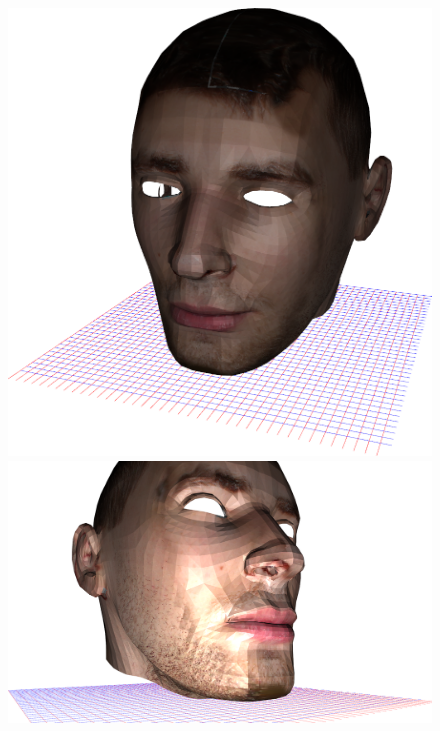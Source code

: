 \documentclass{article}
\begin{document}
\vfill
\begin{figure}[H]
    \centering
    \begin{minipage}{.5\textwidth}
        \centering
        \includegraphics[width=\linewidth]{pic_1.png}
    \end{minipage}%
    \begin{minipage}{.5\textwidth}
        \centering
        \includegraphics[width=\linewidth]{pic_2.png}
    \end{minipage}
    \begin{minipage}{.5\textwidth}

\end{minipage}
\end{figure}
\end{document}
